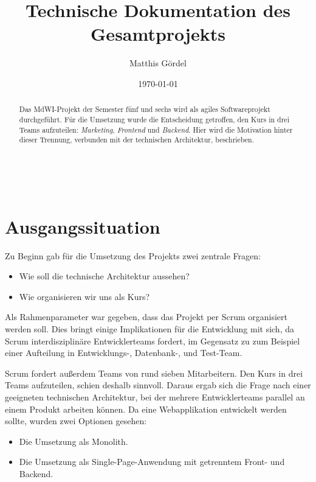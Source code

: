 \documentclass[a4paper, 11pt]{article}
\title{\textbf{Technische Dokumentation des Gesamtprojekts}}
\date{\today} %
\author{Matthis Gördel}
\makeatletter
\renewcommand{\maketitle}{ %
\begin{flushright} %
{\LARGE\@title} %

\vspace{10pt} %

{\large\@author} %
\\\@date %

\vspace{20pt} %
\end{flushright}
}
\makeatother
\begin{document}
\renewcommand{\@listI}{\itemsep=0pt} %


\maketitle %

\begin{abstract}
    Das MdWI-Projekt der Semester fünf und sechs wird als agiles
    Softwareprojekt durchgeführt. Für die Umsetzung wurde die Entscheidung
    getroffen, den Kurs in drei Teams aufzuteilen: \emph{Marketing},
    \emph{Frontend} und \emph{Backend}. Hier wird die Motivation hinter dieser
    Trennung, verbunden mit der technischen Architektur, beschrieben.
\end{abstract}

\section{Ausgangssituation}

Zu Beginn gab für die Umsetzung des Projekts zwei zentrale Fragen:

\begin{itemize}
    \item Wie soll die technische Architektur aussehen?
    \item Wie organisieren wir uns als Kurs?
\end{itemize}

Als Rahmenparameter war gegeben, dass das Projekt per Scrum organisiert werden
soll. Dies bringt einige Implikationen für die Entwicklung mit sich, da Scrum
interdisziplinäre Entwicklerteams fordert, im Gegensatz zu zum Beispiel einer
Aufteilung in Entwicklungs-, Datenbank-, und Test-Team.

Scrum fordert außerdem Teams von rund sieben Mitarbeitern. Den Kurs in drei
Teams aufzuteilen, schien deshalb sinnvoll. Daraus ergab sich die Frage nach
einer geeigneten technischen Architektur, bei der mehrere Entwicklerteams
parallel an einem Produkt arbeiten können. Da eine Webapplikation entwickelt
werden sollte, wurden zwei Optionen gesehen:

\begin{itemize}
    \item Die Umsetzung als Monolith.
    \item Die Umsetzung als Single-Page-Anwendung mit getrenntem Front- und
        Backend. 
\end{itemize}
\end{document}

